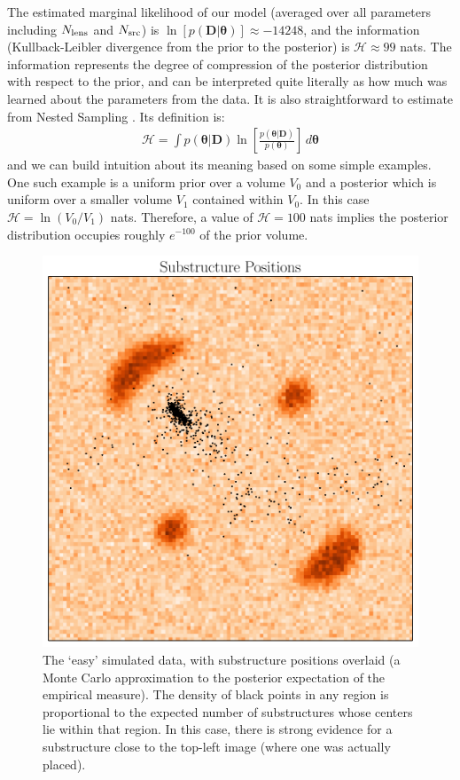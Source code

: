 \documentclass[useAMS,usenatbib]{mn2e}
\newcommand{\revisions}{\color{blue}}
\begin{document}
The estimated marginal likelihood of our model
(averaged over all parameters including $N_{\rm lens}$ and $N_{\rm src}$)
is
$\ln\left[p(\boldsymbol{D} | \boldsymbol{\theta})\right] \approx -14248$, and
the information (Kullback-Leibler divergence from the prior to the posterior)
is $\mathcal{H} \approx 99$ nats. The information represents the degree of
compression of the posterior distribution with respect to the prior, and can
be interpreted quite literally as how much was learned about the parameters from
the data. It is also straightforward to estimate from Nested Sampling
\citep{skilling}. Its definition is:
\begin{eqnarray}
\mathcal{H} = \int p(\boldsymbol{\theta} | \boldsymbol{D})
\ln\left[\frac{p(\boldsymbol{\theta} | \boldsymbol{D})}{p(\boldsymbol{\theta})}\right]
\, d\boldsymbol{\theta}
\end{eqnarray}
and we can build intuition about its meaning based on some simple examples. One
such example is a uniform prior over a volume $V_0$ and a posterior which is
uniform over a smaller volume $V_1$ contained within $V_0$. In this case
$\mathcal{H} = \ln(V_0/V_1)$ nats. Therefore, a value of $\mathcal{H}=100$ nats
implies the posterior distribution occupies roughly $e^{-100}$ of the prior
volume.

\begin{figure}
\begin{center}
\includegraphics[scale=0.4]{substructures.pdf}
\caption{The {\revisions `easy'} simulated data, with substructure positions overlaid (a
Monte Carlo approximation to the posterior expectation of the empirical
measure). The density of black points in any region is proportional to the
expected number of substructures whose centers lie within that region. In this
case, there is strong evidence for a substructure close to the top-left image
(where one was actually placed).
\label{fig:substructures}}
\end{center}
\end{figure}
\end{document}
